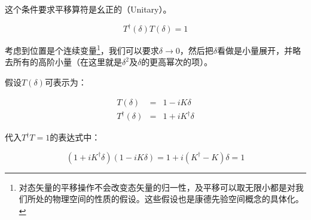 这个条件要求平移算符是幺正的（Unitary）。

\begin{equation}
T^\dagger (\delta) T (\delta ) =  1
\end{equation}

考虑到位置是个连续变量\footnote{对态矢量的平移操作不会改变态矢量的归一性，及平移可以取无限小都是对我们所处的物理空间的性质的假设。这些假设也是康德先验空间概念的具体化。}，我们可以要求$\delta \to 0$，然后把$\delta$看做是小量展开，并略去所有的高阶小量（在这里就是$\delta^2$及$\delta$的更高幂次的项）。

假设$T(\delta)$可表示为：

\begin{eqnarray}
T(\delta) & = & 1- i K \delta \\
T^\dagger (\delta) & = & 1+ i K^\dagger \delta
\end{eqnarray}

代入$T^\dagger T =1$的表达式中：

\begin{equation*}
\left( 1+ i K^\dagger \delta \right) \left( 1- i K \delta \right) = 1 + i \left( K^\dagger - K \right) \delta = 1
\end{equation*}
